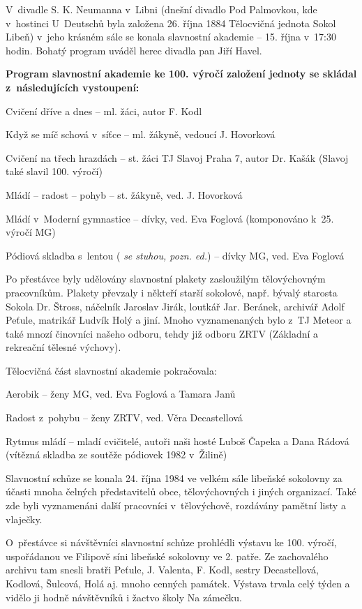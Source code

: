 \documentclass[a5paper, 11pt, twoside]{article}
\newcommand{\pozned}[1]{%
\textit{#1}}
\begin{document}
V~divadle S. K. Neumanna v~Libni (dnešní divadlo Pod Palmovkou, kde
v~hostinci U~Deutschů byla založena 26. října 1884 Tělocvičná jednota
Sokol Libeň) v~jeho krásném sále se konala slavnostní akademie -- 15.
října v~17:30 hodin. Bohatý program uváděl herec divadla pan Jiří Havel.

\textbf{Program slavnostní akademie ke 100. výročí založení jednoty se
skládal z~následujících vystoupení:}

\vspace*{6pt}
Cvičení dříve a dnes -- ml. žáci, autor F. Kodl

Když se míč schová v~síťce -- ml. žákyně, vedoucí J. Hovorková

Cvičení na třech hrazdách -- st. žáci TJ Slavoj Praha 7, autor Dr.
Kašák (Slavoj také slavil 100. výročí)

Mládí -- radost -- pohyb -- st. žákyně, ved. J. Hovorková

Mládí v~Moderní gymnastice -- dívky, ved. Eva Foglová (komponováno
k~25. výročí MG)

Pódiová skladba s~lentou (\pozned{se stuhou, pozn. ed.}) -- dívky MG,
ved. Eva Foglová

\vspace*{6pt}
Po přestávce byly udělovány slavnostní plakety zasloužilým tělovýchovným
pracovníkům. Plakety převzaly i někteří starší sokolové, např. bývalý
starosta Sokola Dr. Štross, náčelník Jaroslav Jirák, loutkář Jar.
Beránek, archivář Adolf Peťule, matrikář Ludvík Holý a jiní. Mnoho
vyznamenaných bylo z~TJ Meteor a také mnozí činovníci našeho odboru,
tehdy již odboru ZRTV (Základní a rekreační tělesné výchovy).

Tělocvičná část slavnostní akademie pokračovala:

\vspace*{6pt}
Aerobik -- ženy MG, ved. Eva Foglová a Tamara Janů

Radost z~pohybu -- ženy ZRTV, ved. Věra Decastellová

Rytmus mládí -- mladí cvičitelé, autoři naši hosté Luboš Čapeka a
Dana Rádová (vítězná skladba ze soutěže pódiovek 1982 v~Žilině)

\vspace*{6pt}
Slavnostní schůze se konala 24. října 1984 ve velkém sále libeňské
sokolovny za účasti mnoha čelných představitelů obce, tělovýchovných i
jiných organizací. Také zde byli vyznamenáni další pracovníci
v~tělovýchově, rozdávány pamětní listy a vlaječky.

O~přestávce si návštěvníci slavnostní schůze prohlédli výstavu ke 100.
výročí, uspořádanou ve Filipově síni libeňské sokolovny ve 2. patře. Ze
zachovalého archivu tam snesli bratři Peťule, J. Valenta, F. Kodl,
sestry Decastellová, Kodlová, Šulcová, Holá aj. mnoho cenných památek.
Výstava trvala celý týden a vidělo ji hodně návštěvníků i žactvo školy
Na zámečku.
\end{document}
